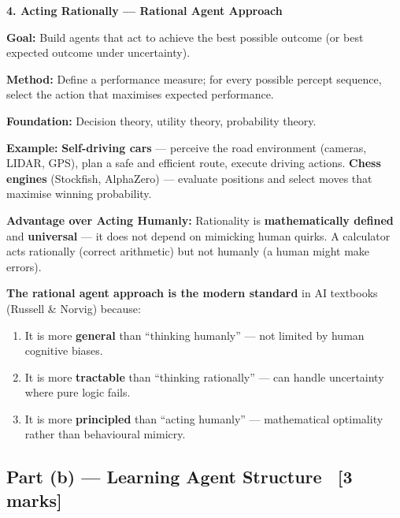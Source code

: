\documentclass[12pt, a4paper]{article}
\newenvironment{answerbox}{\begin{mdframed}[style=answerframe]}{\end{mdframed}}
\begin{document}
\vspace{0.4em}

\noindent\textbf{4. Acting Rationally — Rational Agent Approach}

\begin{keypoints}
  \item \textbf{Goal:} Build agents that act to achieve the best possible outcome (or best expected outcome under uncertainty).
  \item \textbf{Method:} Define a performance measure; for every possible percept sequence, select the action that maximises expected performance.
  \item \textbf{Foundation:} Decision theory, utility theory, probability theory.
  \item \textbf{Example:} \textbf{Self-driving cars} — perceive the road environment (cameras, LIDAR, GPS), plan a safe and efficient route, execute driving actions. \textbf{Chess engines} (Stockfish, AlphaZero) — evaluate positions and select moves that maximise winning probability.
  \item \textbf{Advantage over Acting Humanly:} Rationality is \textbf{mathematically defined} and \textbf{universal} — it does not depend on mimicking human quirks. A calculator acts rationally (correct arithmetic) but not humanly (a human might make errors).
\end{keypoints}

\begin{answerbox}
\textbf{The rational agent approach is the modern standard} in AI textbooks (Russell \& Norvig) because:
\begin{enumerate}[noitemsep]
  \item It is more \textbf{general} than ``thinking humanly'' — not limited by human cognitive biases.
  \item It is more \textbf{tractable} than ``thinking rationally'' — can handle uncertainty where pure logic fails.
  \item It is more \textbf{principled} than ``acting humanly'' — mathematical optimality rather than behavioural mimicry.
\end{enumerate}
\end{answerbox}

\subsection{Part (b) — Learning Agent Structure \ [3 marks]}
\end{document}
